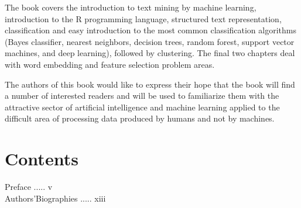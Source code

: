 \documentclass[10pt]{book}
\begin{document}
The book covers the introduction to text mining by machine learning, introduction to the R programming language, structured text representation,\\
classification and easy introduction to the most common classification algorithms (Bayes classifier, nearest neighbors, decision trees, random forest, support vector machines, and deep learning), followed by clustering. The final two chapters deal with word embedding and feature selection problem areas.

The authors of this book would like to express their hope that the book will find a number of interested readers and will be used to familiarize them with the attractive sector of artificial intelligence and machine learning applied to the difficult area of processing data produced by humans and not by machines.

\section*{Contents}
Preface ..... v\\
Authors'Biographies ..... xiii
\end{document}
